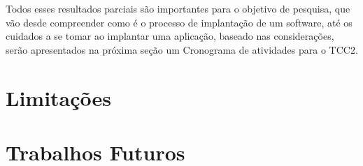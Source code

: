 Todos esses resultados parciais são importantes para o objetivo de pesquisa, que vão
desde compreender como é o processo de implantação de um software, até os cuidados
a se tomar ao implantar uma aplicação, baseado nas considerações, serão apresentados
na próxima seção um Cronograma de atividades para o TCC2.


\section{Limitações}
%

\section{Trabalhos Futuros}
%

